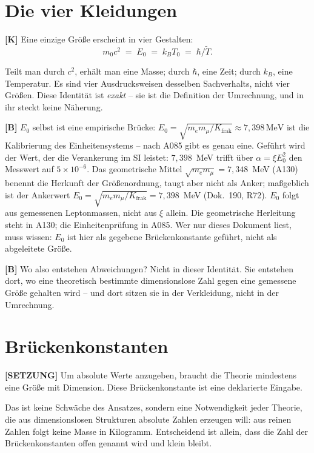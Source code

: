 \section{Die vier Kleidungen}

\textbf{[K]} Eine einzige Größe erscheint in vier Gestalten:
\[
  m_0 c^2 \;=\; E_0 \;=\; k_B T_0 \;=\; \hbar/\tilde T .
\]

Teilt man durch $c^2$, erhält man eine Masse; durch $\hbar$, eine Zeit; durch
$k_B$, eine Temperatur. Es sind vier Ausdrucksweisen desselben Sachverhalts,
nicht vier Größen. Diese Identität ist \emph{exakt} -- sie ist die Definition
der Umrechnung, und in ihr steckt keine Näherung.

\textbf{[B]} $E_0$ selbst ist eine empirische Brücke: $E_0=\sqrt{m_em_\mu/K_\text{frak}}
\approx7{,}398\,\text{MeV}$ ist die Kalibrierung des Einheitensystems -- nach A085 gibt es genau eine. Geführt wird der Wert, der die Verankerung im SI leistet: $7{,}398$~MeV trifft über $\alpha = \xi E_0^2$ den Messwert auf $5\times10^{-6}$. Das geometrische Mittel $\sqrt{m_em_\mu} = 7{,}348$~MeV (A130) benennt die Herkunft der Größenordnung, taugt aber nicht als Anker; maßgeblich ist der Ankerwert $E_0 = \sqrt{m_em_\mu/K_\text{frak}} = 7{,}398$~MeV (Dok.~190, R72). $E_0$ folgt aus gemessenen Leptonmassen, nicht aus $\xi$
allein. Die geometrische Herleitung steht in A130; die Einheitenprüfung in A085.
Wer nur dieses Dokument liest, muss wissen: $E_0$ ist hier als gegebene
Brückenkonstante geführt, nicht als abgeleitete Größe.

\textbf{[B]} Wo also entstehen Abweichungen? Nicht in dieser Identität. Sie
entstehen dort, wo eine theoretisch bestimmte dimensionslose Zahl gegen eine
gemessene Größe gehalten wird -- und dort sitzen sie in der Verkleidung, nicht
in der Umrechnung.

\section{Brückenkonstanten}

\textbf{[SETZUNG]} Um absolute Werte anzugeben, braucht die Theorie mindestens
eine Größe mit Dimension. Diese Brückenkonstante ist eine deklarierte Eingabe.

Das ist keine Schwäche des Ansatzes, sondern eine Notwendigkeit jeder Theorie,
die aus dimensionslosen Strukturen absolute Zahlen erzeugen will: aus reinen
Zahlen folgt keine Masse in Kilogramm. Entscheidend ist allein, dass die Zahl
der Brückenkonstanten offen genannt wird und klein bleibt.

